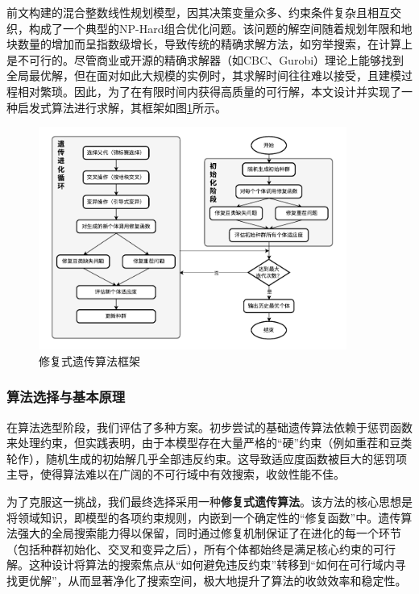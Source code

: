 前文构建的混合整数线性规划模型，因其决策变量众多、约束条件复杂且相互交织，构成了一个典型的NP-Hard组合优化问题。该问题的解空间随着规划年限和地块数量的增加而呈指数级增长，导致传统的精确求解方法，如穷举搜索，在计算上是不可行的。尽管商业或开源的精确求解器（如CBC、Gurobi）理论上能够找到全局最优解，但在面对如此大规模的实例时，其求解时间往往难以接受，且建模过程相对繁琐。因此，为了在有限时间内获得高质量的可行解，本文设计并实现了一种启发式算法进行求解，其框架如图\ref{fig:algorithm_framework}所示。

\begin{figure}[htbp]
    \centering
    \includegraphics[width=0.9\textwidth]{figs/3问题一/遗传算法图.pdf}
    \caption{修复式遗传算法框架}
    \label{fig:algorithm_framework}
\end{figure}


\subsubsection{算法选择与基本原理}

在算法选型阶段，我们评估了多种方案。初步尝试的基础遗传算法依赖于惩罚函数来处理约束，但实践表明，由于本模型存在大量严格的“硬”约束（例如重茬和豆类轮作），随机生成的初始解几乎全部违反约束。这导致适应度函数被巨大的惩罚项主导，使得算法难以在广阔的不可行域中有效搜索，收敛性能不佳。

为了克服这一挑战，我们最终选择采用一种\textbf{修复式遗传算法}。该方法的核心思想是将领域知识，即模型的各项约束规则，内嵌到一个确定性的“修复函数”中。遗传算法强大的全局搜索能力得以保留，同时通过修复机制保证了在进化的每一个环节（包括种群初始化、交叉和变异之后），所有个体都始终是满足核心约束的可行解。这种设计将算法的搜索焦点从“如何避免违反约束”转移到“如何在可行域内寻找更优解”，从而显著净化了搜索空间，极大地提升了算法的收敛效率和稳定性。

